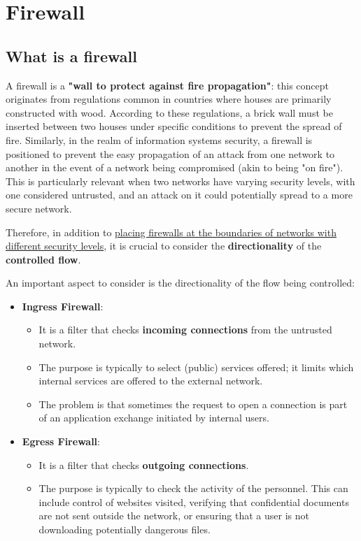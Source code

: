 \chapter{Firewall}

\section{What is a firewall}
A firewall is a \textbf{"wall to protect against fire propagation"}: this concept originates from regulations common in countries where houses are primarily constructed with wood. According to these regulations, a brick wall must be inserted between two houses under specific conditions to prevent the spread of fire. Similarly, in the realm of information systems security, a firewall is positioned to prevent the easy propagation of an attack from one network to another in the event of a network being compromised (akin to being "on fire"). This is particularly relevant when two networks have varying security levels, with one considered untrusted, and an attack on it could potentially spread to a more secure network.

Therefore, in addition to \ul{placing firewalls at the boundaries of networks with different security levels}, it is crucial to consider the \textbf{directionality} of the \textbf{controlled flow}.


An important aspect to consider is the directionality of the flow being controlled:
\begin{itemize}
    \item \textbf{Ingress Firewall}:
          \begin{itemize}
              \item It is a filter that checks \textbf{incoming connections} from the untrusted network.
              \item The purpose is typically to select (public) services offered; it limits which internal services are offered to the external network.
              \item The problem is that sometimes the request to open a connection is part of an application exchange initiated by internal users.
          \end{itemize}
    \item \textbf{Egress Firewall}:
          \begin{itemize}
              \item It is a filter that checks \textbf{outgoing connections}.
              \item The purpose is typically to check the activity of the personnel. This can include control of websites visited, verifying that confidential documents are not sent outside the network, or ensuring that a user is not downloading potentially dangerous files.
          \end{itemize}
\end{itemize}



